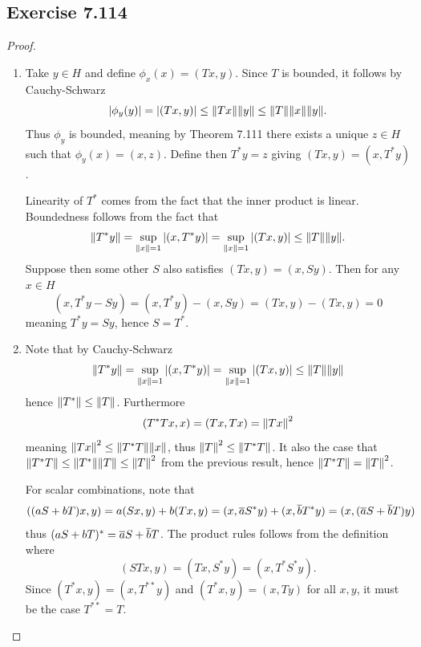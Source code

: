 \documentclass[hw_all.tex]{subfiles}
\begin{document}
\subsection{Exercise 7.114}
\begin{proof}
    \begin{enumerate}
        \item 
            Take $y \in H$ and define $\phi_x(x) = (Tx, y)$. Since $T$ is bounded, it follows by Cauchy-Schwarz
            \[
                |\phi_y(y)| = |(Tx, y)| \leq \norm{Tx} \norm{y} \leq \norm{T} \norm{x} \norm{y}
            .\]
            Thus $\phi_y$ is bounded, meaning by Theorem 7.111 there exists a unique $z \in H$ such that $\phi_y(x) = (x,z)$. Define then $T^* y = z$ giving $(Tx, y) = (x, T^*y)$.

            Linearity of $T^*$ comes from the fact that the inner product is linear. Boundedness follows from the fact that
            \[
                \norm{T^*y} = \sup_{\norm{x} = 1} |(x, T^*y)| = \sup_{\norm{x} = 1} |(Tx, y)| \leq \norm{T} \norm{y}
            .\]
            Suppose then some other $S$ also satisfies $(Tx, y) = (x, Sy)$. Then for any $x \in H$
            \[
                (x, T^*y - Sy) = (x,T^*y) - (x,Sy) = (Tx, y) - (Tx, y) = 0
            \]
            meaning $T^*y = Sy$, hence $S = T^*$.

        \item 
            Note that by Cauchy-Schwarz
            \[
                \norm{T^* y} = \sup_{\norm{x} = 1} |(x, T^*y)| = \sup_{\norm{x} = 1} |(Tx, y)| \leq \norm{T} \norm{y}
            \]
            hence $\norm{T^*} \leq \norm{T}$. Furthermore
            \[
                (T^* T x, x) = (Tx, Tx) = \norm{Tx}^2
            \]
            meaning $\norm{Tx}^2 \leq \norm{T^*T} \norm{x}$, thus $\norm{T}^2 \leq \norm{T^*T}$. It also the case that $\norm{T^* T} \leq \norm{T^*} \norm{T} \leq \norm{T}^2$ from the previous result, hence $\norm{T^* T} = \norm{T}^2$.

            For scalar combinations, note that
            \[
                ((aS + bT)x, y) = a(Sx, y) + b(Tx, y) = (x, \overline{a} S^* y) + (x, \overline{b} T^*y) = (x, (\overline{a}S + \overline{b}T)y)
            \]
            thus $(aS + bT)^* = \overline{a}S + \overline{b}T$. The product rules follows from the definition where
            \[
                (STx, y) = (Tx, S^*y) = (x, T^* S^* y)
            .\]
            Since $(T^* x, y) = (x, T^{**} y)$ and $(T^* x, y) = (x, Ty)$ for all $x,y$, it must be the case $T^{**} = T$.


\end{enumerate}
\end{proof}
\end{document}
